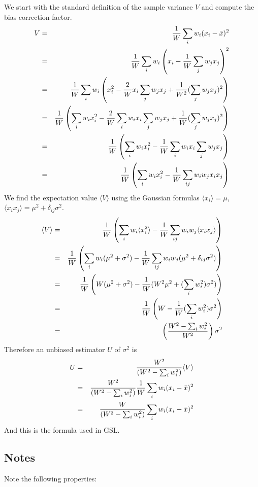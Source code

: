 \documentclass[fleqn,12pt]{article}
\newcommand{\expectation}[1]{\langle #1 \rangle}
\begin{document}
We start with the standard definition of the sample variance $V$ and
compute the bias correction factor.
%
\begin{eqnarray}
V &=& {1\over W} \sum_i w_i (x_i - \bar{x})^2 \\
  &=& {1\over W} \sum_i w_i \left(x_i - {1\over W}\sum_j w_j x_j\right)^2 \\
  &=& {1\over W} \sum_i w_i \left(x_i^2 - {2 \over W} x_i \sum_j w_j x_j 
       + {1 \over W^2} (\sum_j w_j x_j)^2\right) \\
  &=& {1\over W} \left( \sum_i w_i x_i^2 
       - {2 \over W} \sum_i w_i x_i \sum_j w_j x_j
       + {1 \over W} (\sum_j w_j x_j)^2\right)\\
  &=& {1\over W} \left( \sum_i w_i x_i^2 
       - {1 \over W} \sum_i w_i x_i \sum_j w_j x_j\right)\\
  &=& {1\over W} \left( \sum_i w_i x_i^2 
       - {1 \over W} \sum_{ij} w_i w_j x_i x_j\right)
\end{eqnarray}
%
We find the expectation value $\expectation{V}$ using the Gaussian formulas
$\expectation{x_i} = \mu$, $\expectation{x_i x_j} = \mu^2 + \delta_{ij} \sigma^2$.
%
\begin{eqnarray}
\expectation{V}   &=& {1\over W} \left( \sum_i w_i \expectation{x_i^2}
       - {1 \over W} \sum_{ij} w_i w_j \expectation{x_i x_j}\right)\\
      &=& {1\over W} \left( \sum_i w_i (\mu^2 + \sigma^2)
       - {1 \over W} \sum_{ij} w_i w_j (\mu^2 + \delta_{ij} \sigma^2)\right)\\
      &=& {1\over W} \left( W (\mu^2 + \sigma^2)
       - {1 \over W} ( W^2 \mu^2 +( \sum_i w_i^2) \sigma^2)\right)\\
      &=& {1\over W} \left(W - {1 \over W} ( \sum_i w_i^2)\sigma^2\right)\\
      &=& \left({{W^2 - \sum_i w_i^2} \over W^2}\right) \sigma^2
\end{eqnarray}
%
Therefore an unbiased estimator $U$ of $\sigma^2$ is
%
\begin{eqnarray}
U &=& {W^2 \over {(W^2 - \sum_i w_i^2)}} \expectation{V}\\
  &=& {W^2 \over {(W^2 - \sum_i w_i^2)}} {1\over W} \sum_i w_i (x_i - \bar{x})^2 \\
  &=& {W \over {(W^2 - \sum_i w_i^2)}} \sum_i w_i (x_i - \bar{x})^2
\end{eqnarray}
%
And this is the formula used in GSL.
\subsection{Notes}
Note the following properties:
\end{document}
